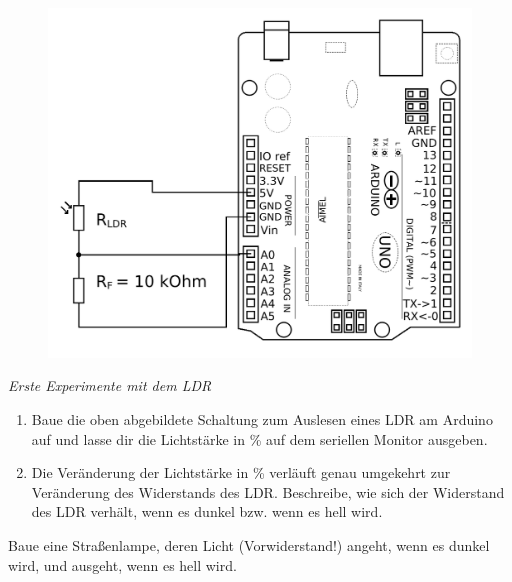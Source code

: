 \hfill
\begin{minipage}{0.48\textwidth}
	\begin{figure}[H]
		\centering
		\includegraphics[width=\textwidth]{./Zeichnungen/ldr-an-arduino2.png}
		\label{abb:schaltplan-ldr}
	\end{figure}
\end{minipage}

\bigskip
\begin{aufgabe}\emph{Erste Experimente mit dem LDR}
	\vspace{-0.3\baselineskip}
	\begin{enumerate}[label=\alph*), itemsep=0ex, parsep=0mm]
		\item Baue die oben abgebildete Schaltung zum Auslesen eines LDR am Arduino auf und lasse dir die Lichtstärke in \% auf dem seriellen Monitor ausgeben.
		\item Die Veränderung der Lichtstärke in \% verläuft genau umgekehrt zur Veränderung des Widerstands des LDR. Beschreibe, wie sich der Widerstand des LDR verhält, wenn es dunkel bzw. wenn es hell wird.
	\end{enumerate}
\end{aufgabe}

\begin{projekt}[Straßenlampe]\label{proj:strassenlampe}
	Baue eine Straßenlampe, deren Licht (Vorwiderstand!) angeht, wenn es dunkel wird, und ausgeht, wenn es hell wird.
\end{projekt}


